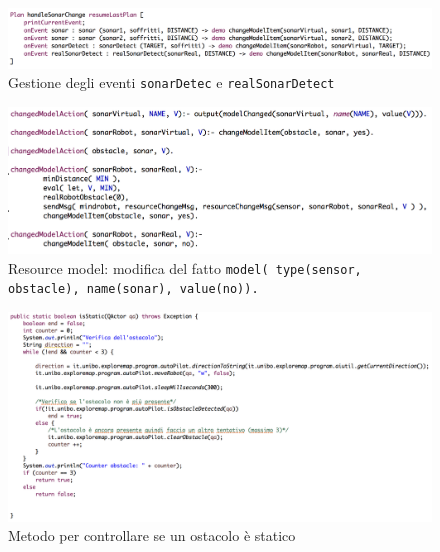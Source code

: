 \documentclass{llncs}
\begin{document}
\begin{figure}
    \centering
    \includegraphics[width=1\textwidth]{Immagini/Requisito5/HandleSonarChangeQA.png}
    \caption{Gestione degli eventi \texttt{sonarDetec} e \texttt{realSonarDetect}}
    \label{fig:R5HandleSonarChange}
\end{figure}
\begin{figure}
    \centering
    \includegraphics[width=1\textwidth]{Immagini/Requisito5/RMSonarRobotChange.png}
    \caption{Resource model: modifica del fatto \texttt{model( type(sensor, obstacle), name(sonar), value(no)).}}
    \label{fig:R5RMHandleSonarChange}
\end{figure}
\begin{figure}
    \centering
    \includegraphics[width=1\textwidth]{Immagini/Requisito5/ObstacleIsStatic.png}
    \caption{Metodo per controllare se un ostacolo \`e statico}
    \label{fig:R5ObstacleIsStatic}
\end{figure}

\pagebreak

\end{document}
